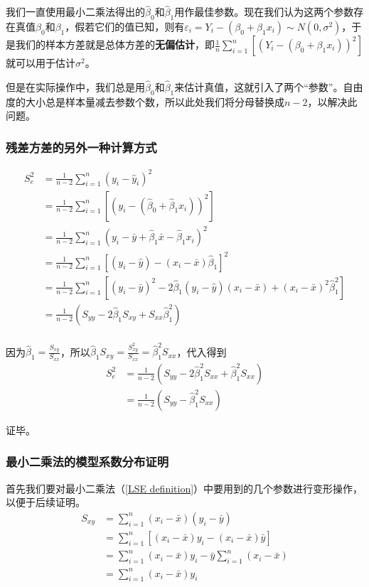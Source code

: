 \documentclass[UTF8]{ctexart}
\begin{document}
我们一直使用最小二乘法得出的$\hat\beta_0$和$\hat\beta_1$用作最佳参数。现在我们认为这两个参数存在真值$\beta_0$和$\beta_1$，假若它们的值已知，则有$\varepsilon_i=Y_i-(\beta_0+\beta_1x_i)\sim N(0,\sigma^2)$，于是我们的样本方差就是总体方差的\textbf{无偏估计}，即$\frac{1}{n}\sum_{i=1}^n[(Y_i-(\beta_0+\beta_1x_i))^2]$就可以用于估计$\sigma^2$。

但是在实际操作中，我们总是用$\hat\beta_0$和$\hat\beta_1$来估计真值，这就引入了两个“参数”。自由度的大小总是样本量减去参数个数，所以此处我们将分母替换成$n-2$，以解决此问题。

\subsubsection{残差方差的另外一种计算方式}
\label{proof16}
\begin{align*}
	S_e^2&=\frac{1}{n-2}\sum_{i=1}^n(y_i-\hat y_i)^2\\
	&=\frac{1}{n-2}\sum_{i=1}^n[(y_i-(\hat\beta_0+\hat\beta_1x_i))^2]\\
	&=\frac{1}{n-2}\sum_{i=1}^n(y_i-\bar y+\hat\beta_1\bar x-\hat\beta_1x_i)^2\\
	&=\frac{1}{n-2}\sum_{i=1}^n[(y_i-\hat y)-(x_i-\bar x)\hat\beta_1]^2\\
	&=\frac{1}{n-2}\sum_{i=1}^n[(y_i-\bar y)^2-2\hat\beta_1(y_i-\hat y)(x_i-\bar x)+(x_i-\bar x)^2\hat\beta_1^2]\\
	&=\frac{1}{n-2}(S_{yy}-2\hat\beta_1S_{xy}+S_{xx}\hat\beta_1^2)\\
\end{align*}

因为$\hat\beta_1=\frac{S_{xy}}{S_{xx}}$，所以$\hat\beta_1S_{xy}=\frac{S_{xy}^2}{S_{xx}}=\hat\beta_1^2S_{xx}$，代入得到
\begin{align*}
	S_e^2&=\frac{1}{n-2}(S_{yy}-2\hat\beta_1^2S_{xx}+\hat\beta_1^2S_{xx})\\
	&=\frac{1}{n-2}(S_{yy}-\hat\beta_1^2S_{xx})
\end{align*}

证毕。

\subsubsection{最小二乘法的模型系数分布证明}
\label{proof17}
首先我们要对最小二乘法（\ref{LSE definition}）中要用到的几个参数进行变形操作，以便于后续证明。
\begin{align*}
	S_{xy}&=\sum_{i=1}^n(x_i-\bar x)(y_i-\bar y)\\
	&=\sum_{i=1}^n[(x_i-\bar x)y_i-(x_i-\bar x)\bar y]\\
	&=\sum_{i=1}^n(x_i-\bar x)y_i-\bar y\sum_{i=1}^n(x_i-\bar x)\\
	&=\sum_{i=1}^n(x_i-\bar x)y_i
\end{align*}
\end{document}
